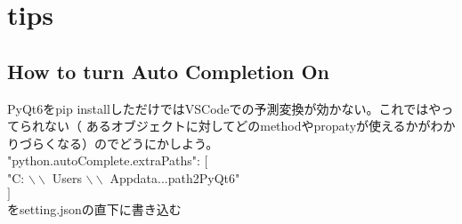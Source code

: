 \documentclass{ltjarticle}
\begin{document}
\section{tips}
\subsection{How to turn Auto Completion On}
PyQt6をpip installしただけではVSCodeでの予測変換が効かない。これではやってられない（
あるオブジェクトに対してどのmethodやpropatyが使えるかがわかりづらくなる）のでどうにかしよう。\\
"python.autoComplete.extraPaths": $\lbrack$ \\
\qquad \qquad    "C: $\backslash \backslash $ Users $\backslash \backslash$ Appdata...path2PyQt6"\\
$\rbrack$ \\
をsetting.jsonの直下に書き込む
\end{document}
